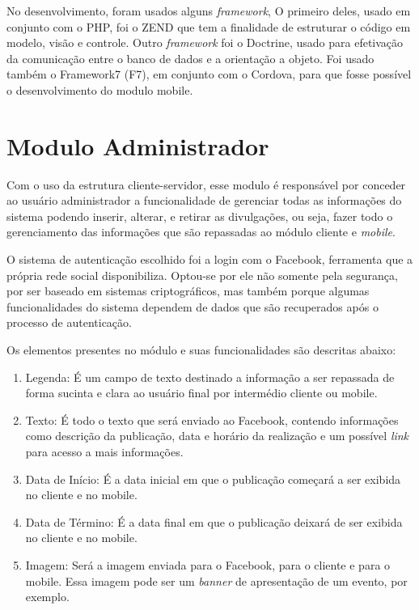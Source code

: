 No desenvolvimento, foram usados alguns \textit{framework}, O primeiro deles, usado em conjunto com o PHP, foi o ZEND que tem a finalidade de estruturar o código em modelo, visão e controle. Outro \textit{framework} foi o Doctrine, usado para efetivação da comunicação entre o banco de dados e a orientação a objeto. Foi usado também o Framework7 (F7), em conjunto com o Cordova, para que fosse possível o desenvolvimento do modulo mobile.  

\section{Modulo Administrador}
Com o uso da estrutura cliente-servidor, esse modulo é responsável por conceder ao usuário administrador a funcionalidade de gerenciar todas as informações do sistema podendo inserir, alterar, e retirar as divulgações, ou seja, fazer todo o gerenciamento das informações que são repassadas ao módulo cliente e \textit{mobile}.

O sistema de autenticação escolhido foi a login com o Facebook, ferramenta que a própria rede social disponibiliza. Optou-se por ele não somente pela segurança, por ser baseado em sistemas criptográficos, mas também porque algumas funcionalidades do sistema dependem de dados que são recuperados após o processo de autenticação.

Os elementos presentes no módulo e suas funcionalidades são descritas abaixo: 

\begin{enumerate}
   \item Legenda: É um campo de texto destinado a informação a ser repassada de forma sucinta e clara ao usuário final por intermédio cliente ou mobile. 
   \item Texto: É todo o texto que será enviado ao Facebook, contendo informações como descrição da publicação, data e horário da realização e um possível \textit{link} para acesso a mais informações. 
   \item Data de Início: É a data inicial em que o publicação começará a ser exibida no cliente e no mobile.
   \item Data de Término: É a data final em que o publicação deixará de ser exibida no cliente e no mobile.
   \item Imagem: Será a imagem enviada para o Facebook, para o cliente e para o mobile. Essa imagem pode ser um \textit{banner} de apresentação de um evento, por exemplo.
 \end{enumerate}

